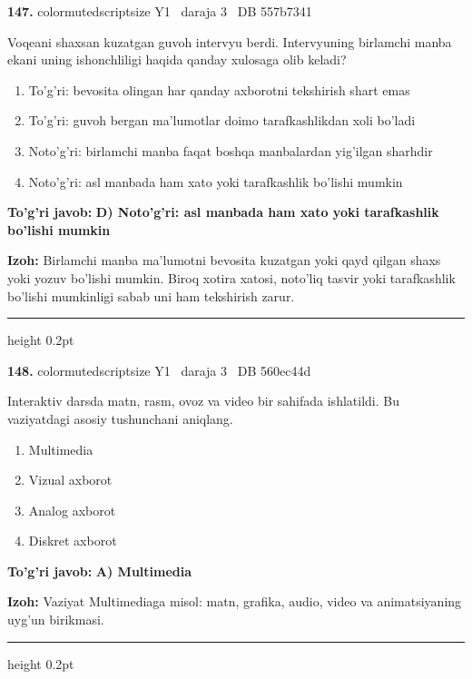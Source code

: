 \documentclass[10pt,a4paper,oneside]{article}
\begin{document}
\noindent\textbf{\color{ink}147.}  {color{muted}scriptsize Y1 \textbullet\ daraja 3 \textbullet\ DB 557b7341}
\par
Voqeani shaxsan kuzatgan guvoh intervyu berdi. Intervyuning birlamchi manba ekani uning ishonchliligi haqida qanday xulosaga olib keladi?
\begin{enumerate}[label=\Alph*),leftmargin=9mm]
\item To'g'ri: bevosita olingan har qanday axborotni tekshirish shart emas
\item To'g'ri: guvoh bergan ma'lumotlar doimo tarafkashlikdan xoli bo'ladi
\item Noto'g'ri: birlamchi manba faqat boshqa manbalardan yig'ilgan sharhdir
\item Noto'g'ri: asl manbada ham xato yoki tarafkashlik bo'lishi mumkin
\end{enumerate}
\begin{tcolorbox}[enhanced,breakable,colback=teal!4,colframe=teal!50!black,boxrule=0.5pt,arc=1.1mm,left=3mm,right=3mm,top=1.7mm,bottom=1.7mm,before skip=2mm,after skip=2mm]
\textbf{\color{teal}To'g'ri javob:} \textbf{D) Noto'g'ri: asl manbada ham xato yoki tarafkashlik bo'lishi mumkin}
\par\smallskip
\textbf{Izoh:} Birlamchi manba ma'lumotni bevosita kuzatgan yoki qayd qilgan shaxs yoki yozuv bo'lishi mumkin. Biroq xotira xatosi, noto'liq tasvir yoki tarafkashlik bo'lishi mumkinligi sabab uni ham tekshirish zarur.
\end{tcolorbox}
\vspace{2mm}\hrule height 0.2pt \vspace{3mm}

\noindent\textbf{\color{ink}148.}  {color{muted}scriptsize Y1 \textbullet\ daraja 3 \textbullet\ DB 560ec44d}
\par
Interaktiv darsda matn, rasm, ovoz va video bir sahifada ishlatildi. Bu vaziyatdagi asosiy tushunchani aniqlang.
\begin{enumerate}[label=\Alph*),leftmargin=9mm]
\item Multimedia
\item Vizual axborot
\item Analog axborot
\item Diskret axborot
\end{enumerate}
\begin{tcolorbox}[enhanced,breakable,colback=teal!4,colframe=teal!50!black,boxrule=0.5pt,arc=1.1mm,left=3mm,right=3mm,top=1.7mm,bottom=1.7mm,before skip=2mm,after skip=2mm]
\textbf{\color{teal}To'g'ri javob:} \textbf{A) Multimedia}
\par\smallskip
\textbf{Izoh:} Vaziyat Multimediaga misol: matn, grafika, audio, video va animatsiyaning uyg'un birikmasi.
\end{tcolorbox}
\vspace{2mm}\hrule height 0.2pt \vspace{3mm}
\end{document}
